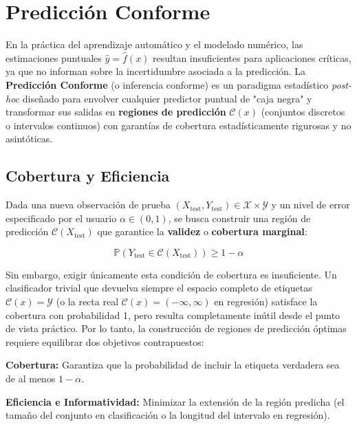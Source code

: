 \section{Predicción Conforme}

En la práctica del aprendizaje automático y el modelado numérico, las estimaciones puntuales $\hat{y} = \hat{f}(x)$ resultan insuficientes para aplicaciones críticas, ya que no informan sobre la incertidumbre asociada a la predicción. La \textbf{Predicción Conforme} (o inferencia conforme) es un paradigma estadístico \textit{post-hoc} diseñado para envolver cualquier predictor puntual de "caja negra" y transformar sus salidas en \textbf{regiones de predicción} $\mathcal{C}(x)$ (conjuntos discretos o intervalos continuos) con garantías de cobertura estadísticamente rigurosas y no asintóticas.

\subsection{Cobertura y Eficiencia}

Dada una nueva observación de prueba $(X_{\text{test}}, Y_{\text{test}}) \in \mathcal{X} \times \mathcal{Y}$ y un nivel de error especificado por el usuario $\alpha \in (0, 1)$, se busca construir una región de predicción $\mathcal{C}(X_{\text{test}})$ que garantice la \textbf{validez} o \textbf{cobertura marginal}:

\begin{equation}
    \mathbb{P}\left( Y_{\text{test}} \in \mathcal{C}(X_{\text{test}}) \right) \ge 1 - \alpha
    \label{eq:marginal_cov}
\end{equation}

Sin embargo, exigir únicamente esta condición de cobertura es insuficiente. Un clasificador trivial que devuelva siempre el espacio completo de etiquetas $\mathcal{C}(x) = \mathcal{Y}$ (o la recta real $\mathcal{C}(x) = (-\infty, \infty)$ en regresión) satisface la cobertura con probabilidad 1, pero resulta completamente inútil desde el punto de vista práctico. Por lo tanto, la construcción de regiones de predicción óptimas requiere equilibrar dos objetivos contrapuestos:


\textbf{Cobertura:} Garantiza que la probabilidad de incluir la etiqueta verdadera sea de al menos $1 - \alpha$.

\textbf{Eficiencia e Informatividad:} Minimizar la extensión de la región predicha (el tamaño del conjunto en clasificación o la longitud del intervalo en regresión).

